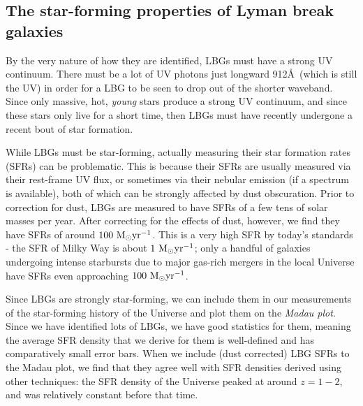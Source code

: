 \documentclass[11pt]{article}
\begin{document}
\subsection{The star-forming properties of Lyman break galaxies}
By the very nature of how they are identified, LBGs must have a strong
UV continuum. There must be a lot of UV photons just longward 912\AA\
(which is still the UV) in order for a LBG to be seen to drop out of
the shorter waveband. Since only massive, hot, {\it young} stars
produce a strong UV continuum, and since these stars only live for a
short time, then LBGs must have recently undergone a recent bout of
star formation.

While LBGs must be star-forming, actually measuring their star
formation rates (SFRs) can be problematic. This is because their SFRs
are usually measured via their rest-frame UV flux, or sometimes via
their nebular emission (if a spectrum is available), both of which can
be strongly affected by dust obscuration. Prior to correction for
dust, LBGs are measured to have SFRs of a few tens of solar masses per
year. After correcting for the effects of dust, however, we find they
have SFRs of around $100~{\rm M_\odot yr^{-1}}$. This is a very high
SFR by today's standards - the SFR of Milky Way is about
$1~{\rm M_\odot yr^{-1}}$; only a handful of galaxies undergoing
intense starbursts due to major gas-rich mergers in the local Universe
have SFRs even approaching $100~{\rm M_\odot yr^{-1}}$.

Since LBGs are strongly star-forming, we can include them in our
measurements of the star-forming history of the Universe and plot them
on the {\it Madau plot}. Since we have identified lots of LBGs, we
have good statistics for them, meaning the average SFR density that we
derive for them is well-defined and has comparatively small error
bars. When we include (dust corrected) LBG SFRs to the Madau plot, we
find that they agree well with SFR densities derived using other
techniques: the SFR density of the Universe peaked at around $z=1-2$,
and was relatively constant before that time.
\end{document}
